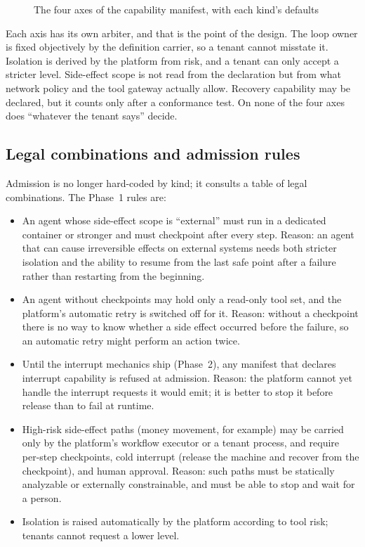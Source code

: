 \begin{figure}[htbp]
{%
}
\caption[The four axes]{The four axes of the capability manifest, with each kind's defaults}
\label{fig:four-axes}
\end{figure}

Each axis has its own arbiter, and that is the point of the design. The loop owner is fixed objectively by the definition carrier, so a tenant cannot misstate it. Isolation is derived by the platform from risk, and a tenant can only accept a stricter level. Side-effect scope is not read from the declaration but from what network policy and the tool gateway actually allow. Recovery capability may be declared, but it counts only after a conformance test. On none of the four axes does ``whatever the tenant says'' decide.

\subsection{Legal combinations and admission rules}

Admission is no longer hard-coded by kind; it consults a table of legal combinations. The Phase~1 rules are:

\begin{itemize}
  \item An agent whose side-effect scope is ``external'' must run in a dedicated container or stronger and must checkpoint after every step. Reason: an agent that can cause irreversible effects on external systems needs both stricter isolation and the ability to resume from the last safe point after a failure rather than restarting from the beginning.
  \item An agent without checkpoints may hold only a read-only tool set, and the platform's automatic retry is switched off for it. Reason: without a checkpoint there is no way to know whether a side effect occurred before the failure, so an automatic retry might perform an action twice.
  \item Until the interrupt mechanics ship (Phase~2), any manifest that declares interrupt capability is refused at admission. Reason: the platform cannot yet handle the interrupt requests it would emit; it is better to stop it before release than to fail at runtime.
  \item High-risk side-effect paths (money movement, for example) may be carried only by the platform's workflow executor or a tenant process, and require per-step checkpoints, cold interrupt (release the machine and recover from the checkpoint), and human approval. Reason: such paths must be statically analyzable or externally constrainable, and must be able to stop and wait for a person.
  \item Isolation is raised automatically by the platform according to tool risk; tenants cannot request a lower level.
\end{itemize}

